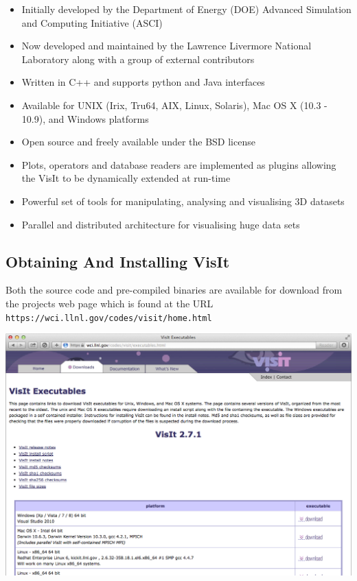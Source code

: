   \begin{itemize}
  \item
    Initially developed by the Department of Energy (DOE) Advanced Simulation
    and Computing Initiative (ASCI) 
  \item
    Now developed and maintained by the Lawrence Livermore National Laboratory
    along with a group of external contributors
  \item
    Written in C++ and supports python and Java interfaces
  \item
    Available for UNIX (Irix, Tru64, AIX, Linux, Solaris), Mac OS X
    (10.3 - 10.9), and Windows platforms
  \item
    Open source and freely available under the BSD license
  \item
    Plots, operators and database readers are implemented as plugins allowing
    the VisIt to be dynamically extended at run-time
  \item
    Powerful set of tools for manipulating, analysing and visualising 3D
    datasets
  \item
    Parallel and distributed architecture for visualising huge data sets
  \end{itemize}

\subsection{Obtaining And Installing VisIt}
  Both the source code and pre-compiled binaries are available for download
  from the projects web page which is found at the URL
  {\tt https://wci.llnl.gov/codes/visit/home.html}

  \begin{center}
    \includegraphics[width=0.8\linewidth]{images/visit_web}
  \end{center}


